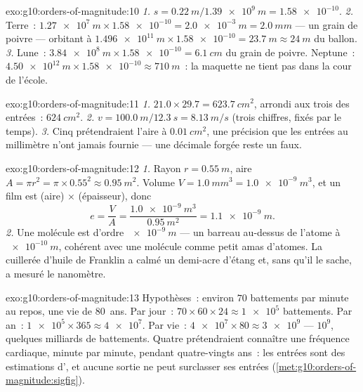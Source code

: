 \begin{solution}{exo:g10:orders-of-magnitude:10}
\emph{1.} $s = \qty{0.22}{m}/\qty{1.39e9}{m} = \num{1.58e-10}$.
\emph{2.} Terre~:
$\qty{1.27e7}{m} \times \num{1.58e-10} = \qty{2.0e-3}{m} =
\qty{2.0}{mm}$ --- un grain de poivre --- orbitant à
$\qty{1.496e11}{m} \times \num{1.58e-10} = \qty{23.7}{m} \approx
\qty{24}{m}$ du ballon.
\emph{3.} Lune~:
$\qty{3.84e8}{m} \times \num{1.58e-10} = \qty{6.1}{cm}$ du grain de
poivre. Neptune~:
$\qty{4.50e12}{m} \times \num{1.58e-10} \approx \qty{710}{m}$~: la
maquette ne tient pas dans la cour de l'école.
\end{solution}

\begin{solution}{exo:g10:orders-of-magnitude:11}
\emph{1.} $21.0 \times 29.7 = \qty{623.7}{cm^2}$, arrondi aux trois
 des entrées~: $\qty{624}{cm^2}$.
\emph{2.} $v = \qty{100.0}{m}/\qty{12.3}{s} = \qty{8.13}{m/s}$ (trois
chiffres, fixés par le temps).
\emph{3.} Cinq  prétendraient l'aire à
$\qty{0.01}{cm^2}$, une précision que les entrées au millimètre n'ont
jamais fournie --- une décimale forgée reste un faux.
\end{solution}

\begin{solution}{exo:g10:orders-of-magnitude:12}
\emph{1.} Rayon $r = \qty{0.55}{m}$, aire
$A = \pi r^{2} = \pi \times 0.55^{2} \approx \qty{0.95}{m^2}$. Volume
$V = \qty{1.0}{mm^3} = \qty{1.0e-9}{m^3}$, et un film est (aire)
$\times$ (épaisseur), donc
\[
e = \frac{V}{A} = \frac{\qty{1.0e-9}{m^3}}{\qty{0.95}{m^2}}
= \qty{1.1e-9}{m} .
\]
\emph{2.} Une molécule est d'ordre $\qty{e-9}{m}$ --- un barreau
au-dessus de l'atome à $\qty{e-10}{m}$, cohérent avec une molécule
comme petit amas d'atomes. La cuillerée d'huile de Franklin a calmé
un demi-acre d'étang et, sans qu'il le sache, a mesuré le nanomètre.
\end{solution}

\begin{solution}{exo:g10:orders-of-magnitude:13}
Hypothèses~: environ $70$ battements par minute au repos, une vie de
$80$~ans. Par jour~: $70 \times 60 \times 24 \approx \num{1e5}$
battements. Par an~: $\num{1e5} \times 365 \approx \num{4e7}$. Par
vie~: $\num{4e7} \times 80 \approx \num{3e9}$ --- 
$10^{9}$, quelques milliards de battements. Quatre  prétendraient connaître une fréquence cardiaque, minute
par minute, pendant quatre-vingts ans~: les entrées sont des
estimations d', et aucune sortie ne peut surclasser
ses entrées (\cref{met:g10:orders-of-magnitude:sigfig}).
\end{solution}

